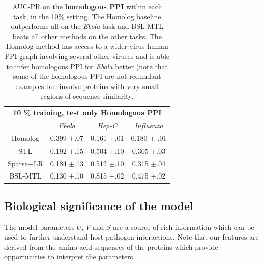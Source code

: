 \documentclass{bioinfo}
\begin{document}
\begin{table}[!h]
\caption{AUC-PR on the \textbf{homologous PPI} within each task, in the 10\% setting. The Homolog baseline outperforms all on the \textit{Ebola} task and BSL-MTL beats all other methods on the other tasks. The Homolog method has access to a wider virus-human PPI graph involving several other viruses and is able to infer homologous PPI for \textit{Ebola} better (note that some of the homologous PPI are not redundant examples but involve proteins with very small regions of sequence similarity.}
\label{homresultsTable}
\begin{small}
\begin{center}
\begin{tabular}{c|ccc}
\toprule
\multicolumn{4}{c}{\textbf{10 \% training, test only Homologous PPI }} \\
& \textit{Ebola} & \textit{Hep-C} & \textit{Influenza} \\ \midrule
Homolog & 0.399 $\pm$.07 & 0.161 $\pm$.01 & 0.180 $\pm$ .01 \\
STL   & 0.192 $\pm$.15 & 0.504 $\pm$.10 & 0.305 $\pm$.03 \\
Sparse+LR & 0.184 $\pm$.13 & 0.512 $\pm$.10 & 0.315 $\pm$.04 \\ 
BSL-MTL & 0.130 $\pm$.10 & 0.815 $\pm$.02 & 0.475 $\pm$.02 \\ \bottomrule
\end{tabular}
\end{center}
\end{small}
\end{table}


\subsection{Biological significance of the model}
\label{bioanalysis}
The model parameters $U$, $V$ and $S$ are a source of rich information which can be used to further understand host-pathogen
interactions. Note that our features are derived from the amino acid sequences of the proteins which provide
opportunities to interpret the parameters.
\end{document}
